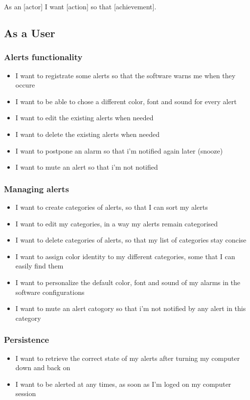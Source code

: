 As an [actor] I want [action] so that [achievement].

\subsection{As a User}
\subsubsection{Alerts functionality}
\begin{itemize}
	\item I want to registrate some alerts so that the software warns me when they occure
	\item I want to be able to chose a different color, font and sound for every alert
	\item I want to edit the existing alerts when needed
	\item I want to delete the existing alerts when needed
	\item I want to postpone an alarm so that i'm notified again later (snooze)
	\item I want to mute an alert so that i'm not notified
\end{itemize}
\subsubsection{Managing alerts}
\begin{itemize}
	\item I want to create categories of alerts, so that I can sort my alerts
	\item I want to edit my categories, in a way my alerts remain categorised
	\item I want to delete categories of alerts, so that my list of categories stay concise
	\item I want to assign color identity to my different categories, some that I can easily find them
	\item I want to personalize the default color, font and sound of my alarms in the software configurations
	\item I want to mute an alert catogory so that i'm not notified by any alert in this category
\end{itemize}
\subsubsection{Persistence}
\begin{itemize}
	\item I want to retrieve the correct state of my alerts after turning my computer down and back on
	\item I want to be alerted at any times, as soon as I'm loged on my computer session
\end{itemize}
